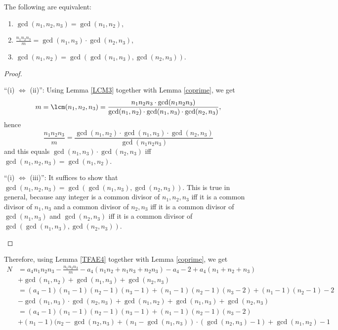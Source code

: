 \begin{lemma}\label{TFAE4}
The following are equivalent:
\begin{enumerate}%
\item $\gcd(n_1,n_2,n_3)=\gcd(n_1,n_2)$,
\item $\frac{n_1n_2n_3}{m}=\gcd(n_1,n_3)\cdot \gcd(n_2,n_3)$,
\item $\gcd(n_1,n_2)=\gcd(\gcd(n_1,n_3),\gcd(n_2,n_3))$.
\end{enumerate}
\end{lemma}
\begin{proof}
\leavevmode
\begin{DESCRIPTION}%
\item[\enquote{(i) $\Leftrightarrow$ (ii)}:] Using Lemma \ref{LCM3} together with Lemma \ref{coprime}, we get 
$$m=\lcm(n_1,n_2,n_3)=\frac{n_1n_2n_3\cdot \gcd(n_1n_2n_3)}{\gcd(n_1,n_2)\cdot \gcd(n_1,n_3)\cdot\gcd(n_2,n_3)},$$
hence $$\frac{n_1n_2n_3}{m}=\frac{\gcd(n_1,n_2)\cdot \gcd(n_1,n_3)\cdot\gcd(n_2,n_3)}{\gcd(n_1n_2n_3)}$$
and this equals $\gcd(n_1,n_3)\cdot\gcd(n_2,n_3)$ iff $\gcd(n_1,n_2,n_3)=\gcd(n_1,n_2)$.
\item[\enquote{(i) $\Leftrightarrow$ (iii)}:] It suffices to show that $\gcd(n_1,n_2,n_3)=\gcd(\gcd(n_1,n_3),\gcd(n_2,n_3))$. This is true in general, because any integer is a common divisor of $n_1,n_2,n_3$ iff it is a common divisor of $n_1,n_3$ and a common divisor of $n_2,n_3$ iff it is a common divisor of $\gcd(n_1,n_3)$ and $\gcd(n_2,n_3)$ iff it is a common divisor of $\gcd(\gcd(n_1,n_3),\gcd(n_2,n_3))$.
\end{DESCRIPTION}
\end{proof}

Therefore, using Lemma \ref{TFAE4} together with Lemma \ref{coprime}, we get
\begin{align*}
N&=a_4n_1n_2n_3-\frac{n_1n_2n_3}{m}-a_4(n_1n_2+n_1n_3+n_2n_3)-a_4-2+a_4(n_1+n_2+n_3)\\
&+\gcd(n_1,n_2)+\gcd(n_1,n_3)+\gcd(n_2,n_3)\\
&=(a_4-1)(n_1-1)(n_2-1)(n_3-1)+(n_1-1)(n_2-1)(n_3-2)+(n_1-1)(n_2-1)-2\\
&-\gcd(n_1,n_3)\cdot\gcd(n_2,n_3)+\gcd(n_1,n_2)+\gcd(n_1,n_3)+\gcd(n_2,n_3)\\
&=(a_4-1)(n_1-1)(n_2-1)(n_3-1)+(n_1-1)(n_2-1)(n_3-2)\\
&+(n_1-1)(n_2-\gcd(n_2,n_3)+(n_1-\gcd(n_1,n_3))\cdot(\gcd(n_2,n_3)-1)+\gcd(n_1,n_2)-1
\end{align*}

